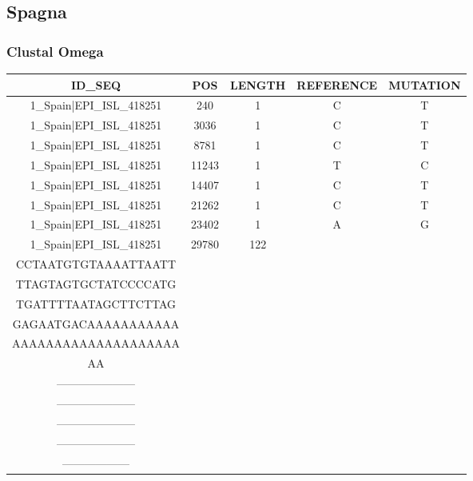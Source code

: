 \documentclass[a4paper,10pt]{article}
\begin{document}
\newpage

\subsection{Spagna}

\subsubsection{Clustal Omega}

\begin{longtable}{@{}ccccc@{}}
\toprule
\textbf{ID\_SEQ} & \textbf{POS} & \textbf{LENGTH} & \textbf{REFERENCE} & \textbf{MUTATION} \\* \midrule
\endfirsthead
%
\cline{1-5}
\endhead
%
1\_Spain|EPI\_ISL\_418251 & 240 & 1 & C & T \\* \midrule
1\_Spain|EPI\_ISL\_418251 & 3036 & 1 & C & T \\* \midrule
1\_Spain|EPI\_ISL\_418251 & 8781 & 1 & C & T \\* \midrule
1\_Spain|EPI\_ISL\_418251 & 11243 & 1 & T & C \\* \midrule
1\_Spain|EPI\_ISL\_418251 & 14407 & 1 & C & T \\* \midrule
1\_Spain|EPI\_ISL\_418251 & 21262 & 1 & C & T \\* \midrule
1\_Spain|EPI\_ISL\_418251 & 23402 & 1 & A & G \\* \midrule
1\_Spain|EPI\_ISL\_418251 & 29780 & 122 & \begin{tabular}[c]{@{}c@{}}AGCTGCCTATATGGAAGAGC\\ CCTAATGTGTAAAATTAATT\\ TTAGTAGTGCTATCCCCATG\\ TGATTTTAATAGCTTCTTAG\\ GAGAATGACAAAAAAAAAAA\\ AAAAAAAAAAAAAAAAAAAA\\ AA\end{tabular} & \begin{tabular}[c]{@{}c@{}}--------------------\\ ---------------------\\ ---------------------\\ ---------------------\\ ---------------------\\ ------------------\end{tabular} \\* \midrule

\end{longtable}
\end{document}
